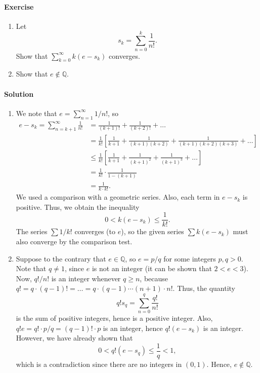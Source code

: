 \documentclass[10pt]{article}
\newcounter{prob}
\def\problem{\stepcounter{prob}\paragraph{Exercise \arabic{prob}}}
\def\solution{\paragraph{Solution}}
\begin{document}
        \problem
        \begin{enumerate}
                \item Let
                \[
                        s_k = \sum_{n = 0}^k \frac{1}{n!}.               
                \]
                Show that $\sum_{k = 0}^\infty k(e - s_k)$ converges.
                \item Show that $e \notin \mathbb{Q}$.
        \end{enumerate}
        \solution
        \begin{enumerate}
                \item We note that $e = \sum_{n = 1}^\infty 1 /n!$, so 
                \begin{align*}
                        e - s_k = \sum_{n = k + 1}^\infty\frac{1}{n!} 
                                &= \frac{1}{(k + 1)!} + \frac{1}{(k + 2)!} + \dots \\
                                &= \frac{1}{k!}\left[\frac{1}{k + 1} + \frac{1}{(k + 1)(k + 2)} + \frac{1}{(k + 1)(k + 2)(k + 3)} + \dots \right] \\
                                &\leq \frac{1}{k!}\left[\frac{1}{k + 1} + \frac{1}{(k + 1)^2} + \frac{1}{(k + 1)^3} + \dots \right] \\
                                &= \frac{1}{k!} \cdot\frac{1}{1 - (k + 1)} \\
                                &= \frac{1}{k\cdot k!}.
                \end{align*}
                We used a comparison with a geometric series. Also, each term in $e - s_k$ is positive. Thus, we obtain the inequality 
                \[
                        0 < k(e - s_k) \leq \frac{1}{k!}.
                \]
                The series $\sum 1 /k!$ converges (to $e$), so the given series $\sum k(e - s_k)$ must also converge by the comparison test.

                \item Suppose to the contrary that $e \in \mathbb{Q}$, so $e = p /q$ for some integers $p, q > 0$.
                Note that $q \neq 1$, since $e$ is not an integer (it can be shown that $2 < e < 3$).
                Now, $q! / n!$ is an integer whenever $q \geq n$, because $q! = q\cdot (q-1)! = \dots = q\cdot(q - 1)\cdots (n + 1)\cdot n!$.
                Thus, the quantity
                \[
                        q!s_q = \sum_{n = 0}^{q} \frac{q!}{n!}
                \]
                is the sum of positive integers, hence is a positive integer. Also, $q!e = q!\cdot p / q = (q - 1)!\cdot p$ is an integer, hence
                $q!(e - s_k)$ is an integer. However, we have already shown that 
                \[
                        0 < q! (e - s_q) \leq \frac{1}{q} < 1,
                \]
                which is a contradiction since there are no integers in $(0, 1)$. Hence, $e \notin \mathbb{Q}$.
        \end{enumerate}
\end{document}
